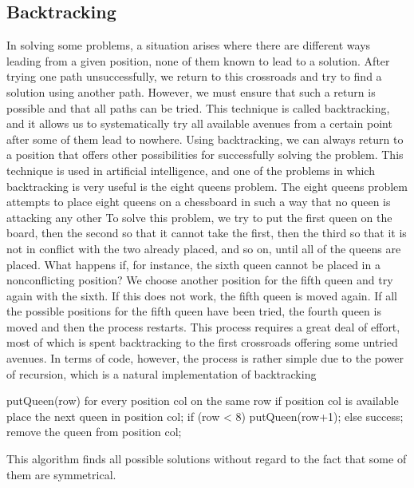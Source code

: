 \documentclass{report}
\begin{document}
\subsection{Backtracking}
\bigbreak \noindent 
In solving some problems, a situation arises where there are different ways leading
from a given position, none of them known to lead to a solution. After trying one path
unsuccessfully, we return to this crossroads and try to find a solution using another
path. However, we must ensure that such a return is possible and that all paths can
be tried. This technique is called backtracking, and it allows us to systematically try
all available avenues from a certain point after some of them lead to nowhere. Using
backtracking, we can always return to a position that offers other possibilities for successfully solving the problem. This technique is used in artificial intelligence, and one
of the problems in which backtracking is very useful is the eight queens problem.
\bigbreak \noindent 
The eight queens problem attempts to place eight queens on a chessboard in
such a way that no queen is attacking any other To solve this problem, we try to put the first
queen on the board, then the second so that it cannot take the first, then the third so
that it is not in conflict with the two already placed, and so on, until all of the queens
are placed. What happens if, for instance, the sixth queen cannot be placed in a nonconflicting position? We choose another position for the fifth queen and try again
with the sixth. If this does not work, the fifth queen is moved again. If all the possible
positions for the fifth queen have been tried, the fourth queen is moved and then the process restarts. This process requires a great deal of effort, most of which is spent
backtracking to the first crossroads offering some untried avenues. In terms of code,
however, the process is rather simple due to the power of recursion, which is a natural implementation of backtracking
\bigbreak \noindent 
\begin{cppcode}
    putQueen(row)
        for every position col on the same row
            if position col is available
                place the next queen in position col;
                if (row < 8)
                    putQueen(row+1);
                else success;
                remove the queen from position col;
\end{cppcode}
\bigbreak \noindent 
This algorithm finds all possible solutions without regard to the fact that some of
them are symmetrical.

\pagebreak 
\end{document}
